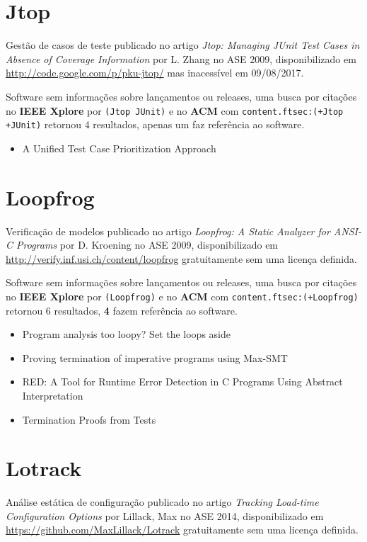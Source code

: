 \section{Jtop}

Gestão de casos de teste
publicado no artigo {\it Jtop: Managing JUnit Test Cases in Absence of Coverage Information}
por L. Zhang
no ASE 2009,
disponibilizado em \url{http://code.google.com/p/pku-jtop/}
mas inacessível em 09/08/2017.

Software sem informações sobre lançamentos ou releases,
uma busca por citações no {\bf IEEE Xplore} por
\texttt{(Jtop JUnit)}
e no {\bf ACM} com
\texttt{content.ftsec:(+Jtop +JUnit)}
retornou
4 resultados,
apenas um faz referência ao software.

\begin{itemize}
\item A Unified Test Case Prioritization Approach
\end{itemize}


\section{Loopfrog}

Verificação de modelos
publicado no artigo {\it Loopfrog: A Static Analyzer for ANSI-C Programs}
por D. Kroening
no ASE 2009,
disponibilizado em \url{http://verify.inf.usi.ch/content/loopfrog}
gratuitamente
sem uma licença definida.

Software sem informações sobre lançamentos ou releases,
uma busca por citações no {\bf IEEE Xplore} por
\texttt{(Loopfrog)}
e no {\bf ACM} com
\texttt{content.ftsec:(+Loopfrog)}
retornou
6 resultados,
{\bf 4} fazem referência ao software.

\begin{itemize}
\item Program analysis too loopy? Set the loops aside
\item Proving termination of imperative programs using Max-SMT
\item RED: A Tool for Runtime Error Detection in C Programs Using Abstract Interpretation
\item Termination Proofs from Tests
\end{itemize}


\section{Lotrack}

Análise estática de configuração
publicado no artigo {\it Tracking Load-time Configuration Options}
por Lillack, Max
no ASE 2014,
disponibilizado em \url{https://github.com/MaxLillack/Lotrack}
gratuitamente
sem uma licença definida.

